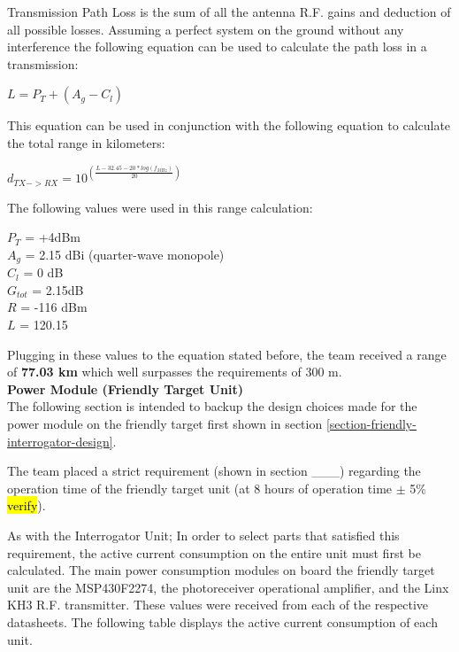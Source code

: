 \documentclass[letterpaper,10pt]{article}
\begin{document}
\begin{spacing}{1.15}
Transmission Path Loss is the sum of all the antenna R.F. gains and deduction of all possible losses. Assuming a perfect system on the ground without any interference the following equation can be used to calculate the path loss in a transmission:
\begin{center}
	$L = P_T + (A_g - C_l)$
\end{center}
This equation can be used in conjunction with the following equation to calculate the total range in kilometers:
\begin{center}
	\large
	$d_{TX->RX} = 10^{\left( \frac{L - 32.45 -20*log(f_{MHz})}{20}\right)}$
\end{center}
The following values were used in this range calculation:
\begin{center}
$P_T$ = +4dBm \\
$A_g$ = 2.15 dBi (quarter-wave monopole) \\
$C_l$ = 0 dB \\ 
$G_{tot}$ =  2.15dB\\
$R$ = -116 dBm \\
$L$ =  120.15\\
\end{center}
Plugging in these values to the equation stated before, the team received a range of \textbf{77.03 km} which well surpasses the requirements of 300 m. \\

\normalsize\textbf{Power Module (Friendly Target Unit)} \\
The following section is intended to backup the design choices made for the power module on the friendly target first shown in section \ref{section-friendly-interrogator-design}.

The team placed a strict requirement (shown in section \_\_\_) regarding the operation time of the friendly target unit (at 8 hours of operation time $\pm$ 5\% \hl{verify}).

As with the Interrogator Unit; In order to select parts that satisfied this requirement, the active current consumption on the entire unit must first be calculated. The main power consumption modules on board the friendly target unit are the MSP430F2274, the photoreceiver operational amplifier, and the Linx KH3 R.F. transmitter. These values were received from each of the respective datasheets. The following table displays the active current consumption of each unit. 



\end{spacing}
\end{document}
